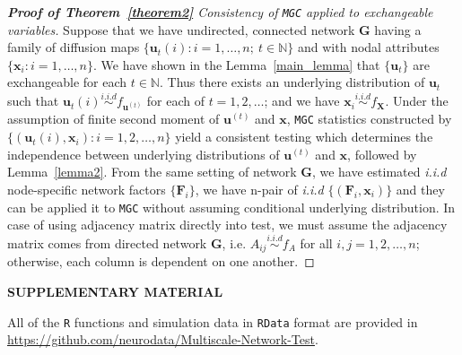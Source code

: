 \documentclass[12pt]{article}
\theoremstyle{definition}
\begin{document}
\begin{proof}[\textbf{Proof of Theorem~\ref{theorem2}} Consistency of \texttt{MGC} applied to exchangeable variables]

Suppose that we have undirected, connected network $\mathbf{G}$ having a family of diffusion maps $\{ \mathbf{u}_{t}(i) : i = 1, \ldots , n ; ~t \in \mathbb{N} \}$ and with nodal attributes $\{ \mathbf{x}_{i} :  i = 1, \ldots , n  \}$. We have shown in the Lemma~\ref{main_lemma} that $\{ \mathbf{u}_{t}  \}$ are exchangeable for each $t \in \mathbb{N}$. Thus there exists an underlying distribution of $\mathbf{u}_{t}$ such that $\mathbf{u}_{t}(i) \overset{i.i.d}{\sim} f_{\mathbf{u}^{(t)}}$ for each of $t= 1,2,\ldots $; and we have $\mathbf{x}_{i} \overset{i.i.d}{\sim} f_{\mathbf{X}}$. Under the assumption of finite second moment of $\mathbf{u}^{(t)}$ and $\mathbf{x}$, \texttt{MGC} statistics constructed by $\{  (  \mathbf{u}_{t}(i), \mathbf{x}_{i} ) : i = 1,2,\ldots, n  \}$ yield a consistent testing which determines the independence between underlying distributions of $\mathbf{u}^{(t)}$ and $\mathbf{x}$, followed by Lemma~\ref{lemma2}. 
From the same setting of network $\mathbf{G}$, we have estimated \textit{i.i.d} node-specific network factors $\{ \mathbf{F}_{i} \}$, we have n-pair of \textit{i.i.d} $\{ ( \mathbf{F}_{i}, \mathbf{x}_{i} )  \}$ and they can be applied it to \texttt{MGC} without assuming conditional underlying distribution. In case of using adjacency matrix directly into test, we must assume the adjacency matrix comes from directed network $\mathbf{G}$, i.e. $A_{ij} \overset{i.i.d}{\sim} f_{A}$ for all $i,j=1,2,\ldots, n$; otherwise, each column is dependent on one another.  
\end{proof}




	
\bigskip
\begin{center}
	{\large\bf SUPPLEMENTARY MATERIAL}
\end{center}
	
All of the \texttt{R} functions and simulation data in \texttt{RData} format are provided in \url{https://github.com/neurodata/Multiscale-Network-Test}.
	
	
\end{document}
